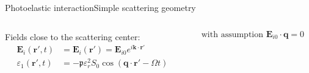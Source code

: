 \documentclass[11pt]{beamer}
\begin{document}
\begin{frame}{Photoelastic interaction}{Simple scattering geometry}
{
		}
		\pause
		\begin{columns}
			\begin{column}{0.6\textwidth}
				Fields close to the scattering center:
				\begin{align*}
					\bm{E}_i (\bm{r}',t) &= \bm{E}_i (\bm{r}') = \bm{E}_{i0} e^{i\bm{k}\cdot\bm{r}'} \\
					\varepsilon_1 (\bm{r}',t) &= -\mathfrak{p} \varepsilon_r^2 S_0 \cos(\bm{q} \cdot \bm{r}' - \Omega t)
				\end{align*}
			\end{column}
			\begin{column}{0.4\textwidth}
				\begin{equation*}
					\text{with assumption } \bm{E}_{i0} \cdot \bm{q} = 0
				\end{equation*}
			\end{column}
		\end{columns}
	\end{frame}
	
\end{document}
